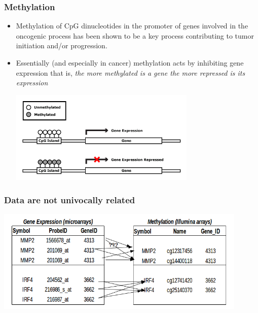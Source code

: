 \documentclass[handout]{beamer}
\begin{document}
\begin{frame}[fragile]\frametitle{Methylation}
\begin{itemize}
\item Methylation of CpG dinucleotides in the promoter of genes
  involved in the oncogenic process has been shown to be a key process
  contributing to tumor initiation and/or progression.
\item Essentially (and especially in cancer) methylation acts by inhibiting gene expression that
  is,\emph{ the more methylated is a gene the more repressed is its expression}
\begin{center}
\includegraphics[width=0.7\textwidth]{./images/methylationAction1.png}
\end{center}
\end{itemize}
\end{frame}


\begin{frame}[fragile]\frametitle{Data are not univocally related}
\begin{center}
\includegraphics[width=0.9\textwidth]{./images/methSitesVSexprSites.png}
\end{center}

\end{frame}
\end{document}
